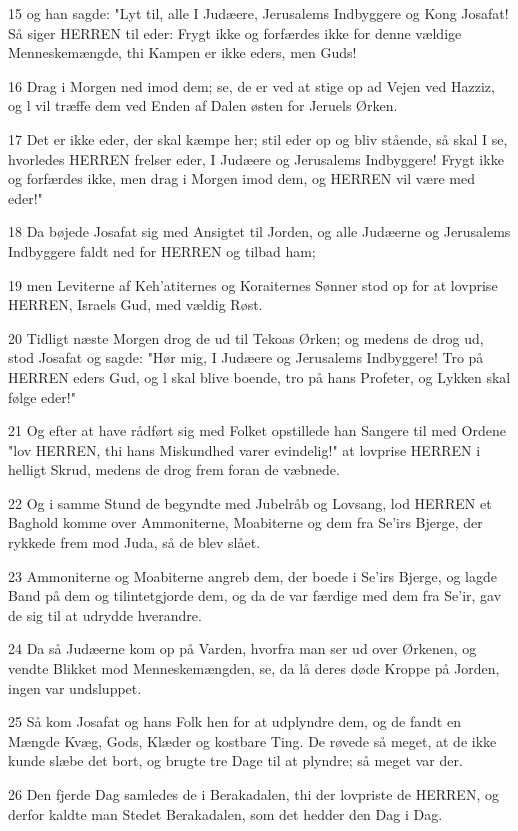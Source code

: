 \par 15 og han sagde: "Lyt til, alle I Judæere, Jerusalems Indbyggere og Kong Josafat! Så siger HERREN til eder: Frygt ikke og forfærdes ikke for denne vældige Menneskemængde, thi Kampen er ikke eders, men Guds!
\par 16 Drag i Morgen ned imod dem; se, de er ved at stige op ad Vejen ved Hazziz, og l vil træffe dem ved Enden af Dalen østen for Jeruels Ørken.
\par 17 Det er ikke eder, der skal kæmpe her; stil eder op og bliv stående, så skal I se, hvorledes HERREN frelser eder, I Judæere og Jerusalems Indbyggere! Frygt ikke og forfærdes ikke, men drag i Morgen imod dem, og HERREN vil være med eder!"
\par 18 Da bøjede Josafat sig med Ansigtet til Jorden, og alle Judæerne og Jerusalems Indbyggere faldt ned for HERREN og tilbad ham;
\par 19 men Leviterne af Keh'atiternes og Koraiternes Sønner stod op for at lovprise HERREN, Israels Gud, med vældig Røst.
\par 20 Tidligt næste Morgen drog de ud til Tekoas Ørken; og medens de drog ud, stod Josafat og sagde: "Hør mig, I Judæere og Jerusalems Indbyggere! Tro på HERREN eders Gud, og l skal blive boende, tro på hans Profeter, og Lykken skal følge eder!"
\par 21 Og efter at have rådført sig med Folket opstillede han Sangere til med Ordene "lov HERREN, thi hans Miskundhed varer evindelig!" at lovprise HERREN i helligt Skrud, medens de drog frem foran de væbnede.
\par 22 Og i samme Stund de begyndte med Jubelråb og Lovsang, lod HERREN et Baghold komme over Ammoniterne, Moabiterne og dem fra Se'irs Bjerge, der rykkede frem mod Juda, så de blev slået.
\par 23 Ammoniterne og Moabiterne angreb dem, der boede i Se'irs Bjerge, og lagde Band på dem og tilintetgjorde dem, og da de var færdige med dem fra Se'ir, gav de sig til at udrydde hverandre.
\par 24 Da så Judæerne kom op på Varden, hvorfra man ser ud over Ørkenen, og vendte Blikket mod Menneskemængden, se, da lå deres døde Kroppe på Jorden, ingen var undsluppet.
\par 25 Så kom Josafat og hans Folk hen for at udplyndre dem, og de fandt en Mængde Kvæg, Gods, Klæder og kostbare Ting. De røvede så meget, at de ikke kunde slæbe det bort, og brugte tre Dage til at plyndre; så meget var der.
\par 26 Den fjerde Dag samledes de i Berakadalen, thi der lovpriste de HERREN, og derfor kaldte man Stedet Berakadalen, som det hedder den Dag i Dag.
